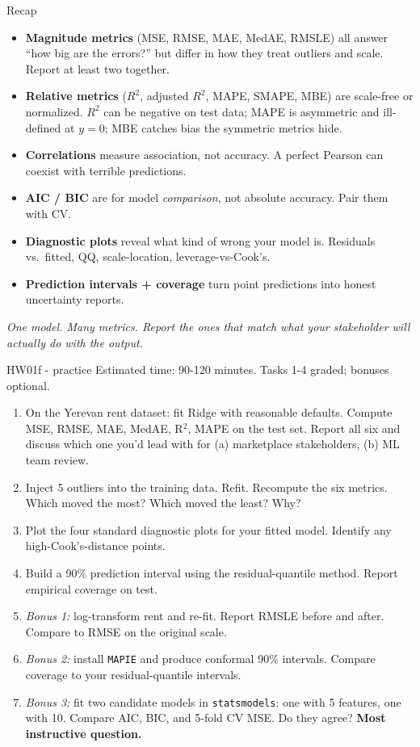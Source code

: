 \documentclass[aspectratio=169]{beamer}
\begin{document}
\begin{frame}{Recap}
  \begin{itemize}\small
    \item \textbf{Magnitude metrics} (MSE, RMSE, MAE, MedAE, RMSLE) all answer ``how big are the errors?'' but differ in how they treat outliers and scale. Report at least two together.
    \item \textbf{Relative metrics} ($R^2$, adjusted $R^2$, MAPE, SMAPE, MBE) are scale-free or normalized. $R^2$ can be negative on test data; MAPE is asymmetric and ill-defined at $y=0$; MBE catches bias the symmetric metrics hide.
    \item \textbf{Correlations} measure association, not accuracy. A perfect Pearson can coexist with terrible predictions.
    \item \textbf{AIC / BIC} are for model \emph{comparison}, not absolute accuracy. Pair them with CV.
    \item \textbf{Diagnostic plots} reveal what kind of wrong your model is. Residuals vs.\ fitted, QQ, scale-location, leverage-vs-Cook's.
    \item \textbf{Prediction intervals + coverage} turn point predictions into honest uncertainty reports.
  \end{itemize}
  \vfill
  \emph{One model. Many metrics. Report the ones that match what your stakeholder will actually do with the output.}
\end{frame}

\begin{frame}{HW01f - practice}
  \footnotesize Estimated time: 90-120 minutes. Tasks 1-4 graded; bonuses optional.
  \begin{enumerate}\small
    \item On the Yerevan rent dataset: fit Ridge with reasonable defaults. Compute MSE, RMSE, MAE, MedAE, R$^2$, MAPE on the test set. Report all six and discuss which one you'd lead with for (a) marketplace stakeholders, (b) ML team review.
    \item Inject 5 outliers into the training data. Refit. Recompute the six metrics. Which moved the most? Which moved the least? Why?
    \item Plot the four standard diagnostic plots for your fitted model. Identify any high-Cook's-distance points.
    \item Build a 90\% prediction interval using the residual-quantile method. Report empirical coverage on test.
    \item \emph{Bonus 1:} log-transform rent and re-fit. Report RMSLE before and after. Compare to RMSE on the original scale.
    \item \emph{Bonus 2:} install \texttt{MAPIE} and produce conformal 90\% intervals. Compare coverage to your residual-quantile intervals.
    \item \emph{Bonus 3:} fit two candidate models in \texttt{statsmodels}: one with 5 features, one with 10. Compare AIC, BIC, and 5-fold CV MSE. Do they agree? \textbf{Most instructive question.}
  \end{enumerate}
\end{frame}
\end{document}
